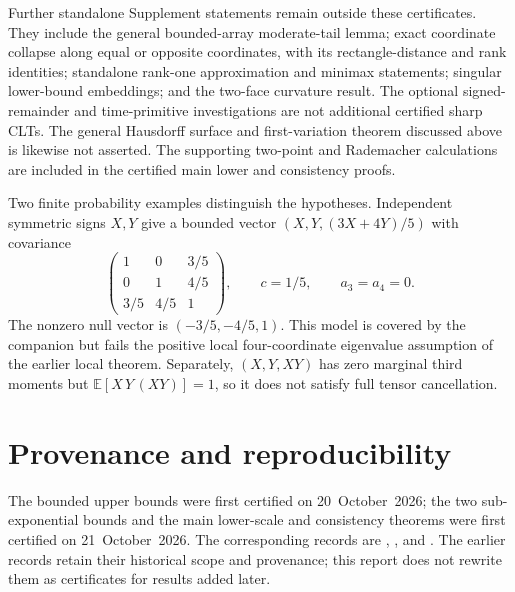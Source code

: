 \documentclass[11pt]{article}
\newcommand{\E}{\mathbb E}
\begin{document}
Further standalone Supplement statements remain outside these
certificates. They include the general bounded-array moderate-tail
lemma; exact coordinate collapse along equal or opposite coordinates,
with its rectangle-distance and rank identities; standalone rank-one
approximation and minimax statements; singular lower-bound embeddings;
and the two-face curvature result. The optional signed-remainder and
time-primitive investigations
are not additional certified sharp CLTs. The general Hausdorff surface
and first-variation theorem discussed above is likewise not asserted.
The supporting two-point and Rademacher calculations are included in
the certified main lower and consistency proofs.

Two finite probability examples distinguish the hypotheses. Independent
symmetric signs $X,Y$ give a bounded vector
$(X,Y,(3X+4Y)/5)$ with covariance
\[
 \begin{pmatrix}1&0&3/5\\0&1&4/5\\3/5&4/5&1\end{pmatrix},
 \qquad c=1/5,\qquad a_3=a_4=0.
\]
The nonzero null vector is $(-3/5,-4/5,1)$. This model is covered by
the companion but fails the positive local four-coordinate eigenvalue
assumption of the earlier local theorem. Separately, $(X,Y,XY)$ has
zero marginal third moments but $\E[X\,Y\,(XY)]=1$, so it does not
satisfy full tensor cancellation.

\section{Provenance and reproducibility}
The bounded upper bounds were first certified on 20~October~2026;
the two sub-exponential bounds and the main lower-scale and consistency
theorems were first certified on 21~October~2026. The corresponding
records are ,
, and
. The earlier records retain their
historical scope and provenance; this report does not rewrite them as
certificates for results added later.
\end{document}
